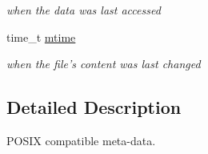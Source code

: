 \begin{CompactItemize}
\begin{CompactList}\small\item\em when the data was last accessed \item\end{CompactList}\item 
\hypertarget{struct__posixmd_o7}{
time\_\-t \hyperlink{struct__posixmd_o7}{mtime}}
\label{struct__posixmd_o7}

\begin{CompactList}\small\item\em when the file's content was last changed \item\end{CompactList}\end{CompactItemize}


\subsection{Detailed Description}
POSIX compatible meta-data. 

